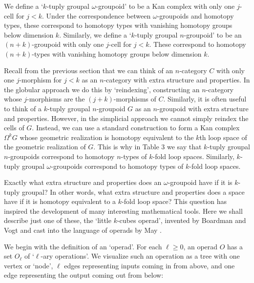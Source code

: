 We define a `$k$-tuply groupal $\omega$-groupoid' to be a Kan complex
with only one $j$-cell for $j < k$.   Under the correspondence between
$\omega$-groupoids and homotopy types, these correspond to homotopy
types with vanishing homotopy groups below dimension $k$.  Similarly, we
define a `$k$-tuply groupal $n$-groupoid' to be an $(n+k)$-groupoid with
only one $j$-cell for $j < k$.  These correspond to homotopy
$(n+k)$-types with vanishing homotopy groups below dimension $k$.  

Recall from the previous section that we can think of an $n$-category
$C$ with only one $j$-morphism for $j < k$  as an $n$-category with
extra structure and properties.  In the globular approach we do this by
`reindexing', constructing an $n$-category whose $j$-morphisms are the
$(j+k)$-morphisms of $C$.   Similarly, it is often useful to think of a
$k$-tuply groupal $n$-groupoid $G$ as an $n$-groupoid with extra
structure and properties.   However, in the simplicial approach we
cannot simply reindex the cells of $G$.   Instead, we can use a standard
construction \cite{May} to form a Kan complex $\Omega^k G$ whose
geometric realization is homotopy equivalent to the $k$th loop space of
the geometric realization of $G$.    This is why in Table 3 we say that
$k$-tuply groupal $n$-groupoids correspond to homotopy $n$-types of
$k$-fold loop spaces.   Similarly, $k$-tuply groupal $\omega$-groupoids
correspond to homotopy types of $k$-fold loop spaces.  

Exactly what extra structure and properties does an $\omega$-groupoid
have if it is $k$-tuply groupal?  In other words, what extra structure
and properties does a space have if it is homotopy equivalent to a
$k$-fold loop space?  This question has inspired the development of many
interesting mathematical tools.  Here we shall describe just one of
these, the `little $k$-cubes operad', invented by Boardman and Vogt
\cite{BV,BV2} and cast into the language of operads by May \cite{May2}.

We begin with the definition of an `operad'.  For each $\ell \ge 0$, an
operad $O$ has a set $O_\ell$ of `$\ell$-ary operations'.  We visualize
such an operation as a tree with one vertex or `node', $\ell$ edges
representing inputs coming in from above, and one edge representing the
output coming out from below:

